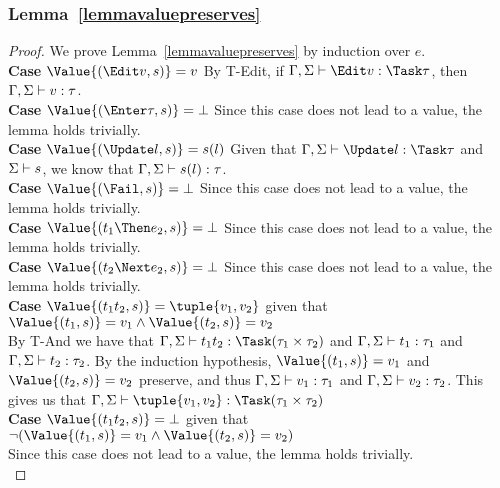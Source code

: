 \subsubsection{Lemma~\ref{lemmavaluepreserves}}
\begin{proof}
  We prove Lemma~\ref{lemmavaluepreserves} by induction over $e$.\\

  \noindent\textbf{Case} $\Value{(\Edit v,s)}=v$ By T-Edit, if $\Gamma,\Sigma\infers \Edit v:\Task\tau$, then $\Gamma,\Sigma\vdash v:\tau$.\\

  \noindent\textbf{Case} $\Value{(\Enter \tau,s)}=\bot$ Since this case does not lead to a value, the lemma holds trivially.\\

  \noindent\textbf{Case} $\Value{(\Update l,s)}=s(l)$ Given that $\Gamma,\Sigma\infers\Update l:\Task \tau$ and $\Sigma\vdash s$, we know that $\Gamma,\Sigma\vdash s(l):\tau$.\\

  \noindent\textbf{Case} $\Value{(\Fail,s)}=\bot$ Since this case does not lead to a value, the lemma holds trivially.\\

  \noindent\textbf{Case} $\Value{(t_1\Then e_2,s)}=\bot$ Since this case does not lead to a value, the lemma holds trivially.\\

  \noindent\textbf{Case} $\Value{(t_2\Next e_2,s)}=\bot$ Since this case does not lead to a value, the lemma holds trivially.\\

  \noindent\textbf{Case} $\Value{(t_1\And t_2,s)}=\tuple{v_1, v_2}$ given that $\Value{(t_1,s)}=v_1\wedge\Value{(t_2,s)}=v_2$\\ By T-And we have that $\Gamma,\Sigma\infers t_1\And t_2:\Task(\tau_1\times\tau_2)$ and $\Gamma,\Sigma\vdash t_1:\tau_1$ and $\Gamma,\Sigma\vdash t_2:\tau_2$. By the induction hypothesis, $ \Value{(t_1,s)}=v_1$ and $\Value{(t_2,s)}=v_2$ preserve, and thus $\Gamma,\Sigma\vdash v_1:\tau_1$ and $\Gamma,\Sigma\vdash v_2:\tau_2$. This gives us that $\Gamma,\Sigma\infers \tuple{v_1, v_2}:\Task(\tau_1\times\tau_2)$ \\

  \noindent\textbf{Case} $\Value{(t_1\And t_2,s)}=\bot$ given that $\neg(\Value{(t_1,s)}=v_1\wedge\Value{(t_2,s)}=v_2)$\\ Since this case does not lead to a value, the lemma holds trivially.\\


\end{proof}
